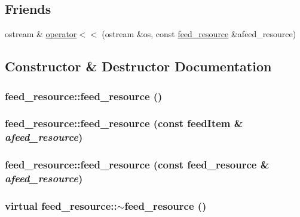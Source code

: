 \subsection*{Friends}
\begin{DoxyCompactItemize}
\item 
ostream \& \hyperlink{classfeed__resource_aac858c94a22c316b401e81352546407e}{operator$<$$<$} (ostream \&os, const \hyperlink{classfeed__resource}{feed\_\-resource} \&afeed\_\-resource)
\end{DoxyCompactItemize}


\subsection{Constructor \& Destructor Documentation}
\hypertarget{classfeed__resource_a2a10168a7c126d7ebc6d48518d7f8b8f}{
\subsubsection[{feed\_\-resource}]{\setlength{\rightskip}{0pt plus 5cm}feed\_\-resource::feed\_\-resource ()}}
\label{classfeed__resource_a2a10168a7c126d7ebc6d48518d7f8b8f}
\hypertarget{classfeed__resource_a3d6f9eaddaf2e64f71e72d9a4d21a0a7}{
\subsubsection[{feed\_\-resource}]{\setlength{\rightskip}{0pt plus 5cm}feed\_\-resource::feed\_\-resource (const {\bf feedItem} \& {\em afeed\_\-resource})}}
\label{classfeed__resource_a3d6f9eaddaf2e64f71e72d9a4d21a0a7}
\hypertarget{classfeed__resource_a6a2054dc5b99a5c6eb1383677c8dd299}{
\subsubsection[{feed\_\-resource}]{\setlength{\rightskip}{0pt plus 5cm}feed\_\-resource::feed\_\-resource (const {\bf feed\_\-resource} \& {\em afeed\_\-resource})}}
\label{classfeed__resource_a6a2054dc5b99a5c6eb1383677c8dd299}
\hypertarget{classfeed__resource_a24d140b370338432017a15350f763846}{
\subsubsection[{$\sim$feed\_\-resource}]{\setlength{\rightskip}{0pt plus 5cm}virtual feed\_\-resource::$\sim$feed\_\-resource ()}}
\label{classfeed__resource_a24d140b370338432017a15350f763846}


